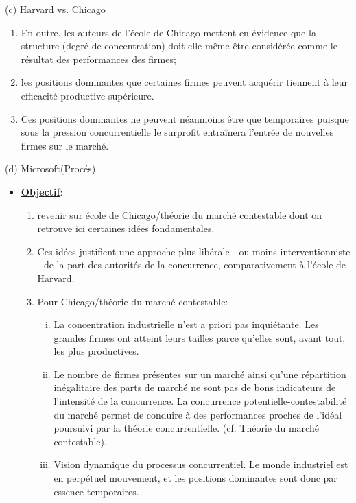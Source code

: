 \begin{frame}[allowframebreaks]{(c) Harvard vs. Chicago}
\begin{itemize}
\begin{enumerate}[-]
\begin{enumerate}[$\star$]
    \item Pour Chicago, les plus grandes firmes évoluant sur un marché concentré sont 
    donc fondamentalement plus productives.
\end{enumerate}
\item En outre, les auteurs de l’école de Chicago mettent en évidence que la structure (degré de concentration)
 doit elle-même être considérée comme le résultat des performances des firmes;
 \item les positions dominantes que certaines firmes peuvent acquérir 
 tiennent à leur efficacité productive supérieure. 
 \item Ces positions dominantes ne peuvent néanmoins être que temporaires puisque sous la pression 
 concurrentielle le surprofit entraînera l’entrée de nouvelles firmes sur le marché. 
\end{enumerate}
\end{itemize}
\end{frame}

\begin{frame}[allowframebreaks]{(d) Microsoft(Procés)}
\begin{itemize}
\item \textbf{\underline{Objectif}}: 
\begin{enumerate}[-]
\item revenir sur école de Chicago/théorie du marché contestable dont on retrouve 
ici certaines idées fondamentales. 
\item Ces idées justifient une approche plus libérale - ou moins interventionniste - de la part 
des autorités de la concurrence, comparativement à l’école de Harvard. 
\item Pour Chicago/théorie du marché contestable:
\begin{enumerate}[(i)]
\item La concentration industrielle n’est a priori pas inquiétante. 
Les grandes firmes ont atteint leurs tailles parce qu’elles sont, avant tout, les plus productives. 
\item Le nombre de firmes présentes sur un marché ainsi qu’une répartition inégalitaire des 
parts de marché ne sont pas de bons indicateurs de l’intensité de la concurrence. La concurrence 
potentielle-contestabilité du marché permet de conduire à des performances 
proches de l’idéal poursuivi par la théorie concurrentielle. 
(cf. Théorie du marché contestable).
\item Vision dynamique du processus concurrentiel. Le monde industriel est en perpétuel 
mouvement, et les positions dominantes sont donc par essence temporaires. 
\end{enumerate}
\end{enumerate}  
\end{itemize}
\end{frame}

